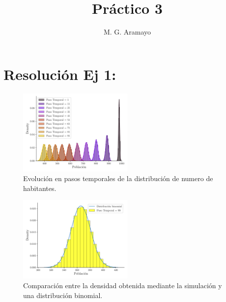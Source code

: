 \documentclass[twocolumn,aps,prl]{revtex4-1}
\begin{document}

\title{Práctico 3}
\author{M. G. Aramayo}


\maketitle



\section{Resolución Ej 1:}

\begin{figure}[!ht]
    \centering  
    \includegraphics[width=0.5\textwidth]{figuras/evolucion_temporal.pdf}
    \caption{Evolución en pasos temporales de la distribución de numero de habitantes.}
    \label{fig:evolucion_temporal} 
\end{figure}

\begin{figure}[!ht]  
    \centering  
    \includegraphics[width=0.5\textwidth]{figuras/ultima_iteracion.pdf}
    \caption{Comparación entre la densidad obtenida mediante la   simulación y una distribución binomial.}
    \label{fig:ultima_iteracion}
\end{figure}
\end{document}
